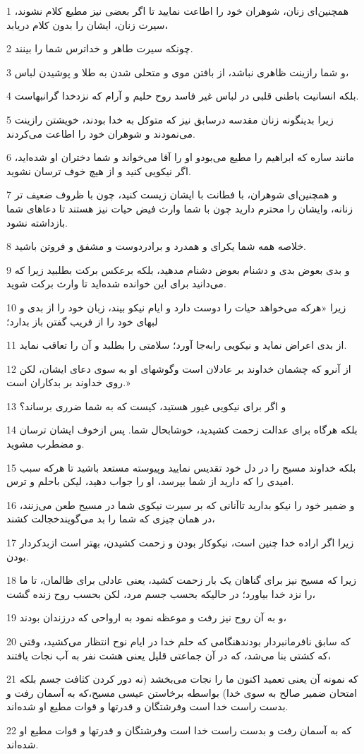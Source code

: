 \par 1 همچنین‌ای زنان، شوهران خود را اطاعت نمایید تا اگر بعضی نیز مطیع کلام نشوند، سیرت زنان، ایشان را بدون کلام دریابد،
\par 2 چونکه سیرت طاهر و خداترس شما را بینند.
\par 3 و شما رازینت ظاهری نباشد، از بافتن موی و متحلی شدن به طلا و پوشیدن لباس،
\par 4 بلکه انسانیت باطنی قلبی در لباس غیر فاسد روح حلیم و آرام که نزدخدا گرانبهاست.
\par 5 زیرا بدینگونه زنان مقدسه درسابق نیز که متوکل به خدا بودند، خویشتن رازینت می‌نمودند و شوهران خود را اطاعت می‌کردند.
\par 6 مانند ساره که ابراهیم را مطیع می‌بودو او را آقا می‌خواند و شما دختران او شده‌اید، اگر نیکویی کنید و از هیچ خوف ترسان نشوید.
\par 7 و همچنین‌ای شوهران، با فطانت با ایشان زیست کنید، چون با ظروف ضعیف تر زنانه، وایشان را محترم دارید چون با شما وارث فیض حیات نیز هستند تا دعاهای شما بازداشته نشود.
\par 8 خلاصه همه شما یکرای و همدرد و برادردوست و مشفق و فروتن باشید.
\par 9 و بدی بعوض بدی و دشنام بعوض دشنام مدهید، بلکه برعکس برکت بطلبید زیرا که می‌دانید برای این خوانده شده‌اید تا وارث برکت شوید.
\par 10 زیرا «هرکه می‌خواهد حیات را دوست دارد و ایام نیکو بیند، زبان خود را از بدی و لبهای خود را از فریب گفتن باز بدارد؛
\par 11 از بدی اعراض نماید و نیکویی رابه‌جا آورد؛ سلامتی را بطلبد و آن را تعاقب نماید.
\par 12 از آنرو که چشمان خداوند بر عادلان است وگوشهای او به سوی دعای ایشان، لکن روی خداوند بر بدکاران است.»
\par 13 و اگر برای نیکویی غیور هستید، کیست که به شما ضرری برساند؟
\par 14 بلکه هرگاه برای عدالت زحمت کشیدید، خوشابحال شما. پس ازخوف ایشان ترسان و مضطرب مشوید.
\par 15 بلکه خداوند مسیح را در دل خود تقدیس نمایید وپیوسته مستعد باشید تا هرکه سبب امیدی را که دارید از شما بپرسد، او را جواب دهید، لیکن باحلم و ترس.
\par 16 و ضمیر خود را نیکو بدارید تاآنانی که بر سیرت نیکوی شما در مسیح طعن می‌زنند، در همان چیزی که شما را بد می‌گویندخجالت کشند،
\par 17 زیرا اگر اراده خدا چنین است، نیکوکار بودن و زحمت کشیدن، بهتر است ازبدکردار بودن.
\par 18 زیرا که مسیح نیز برای گناهان یک بار زحمت کشید، یعنی عادلی برای ظالمان، تا ما را نزد خدا بیاورد؛ در حالیکه بحسب جسم مرد، لکن بحسب روح زنده گشت،
\par 19 و به آن روح نیز رفت و موعظه نمود به ارواحی که درزندان بودند،
\par 20 که سابق نافرمانبردار بودندهنگامی که حلم خدا در ایام نوح انتظار می‌کشید، وقتی که کشتی بنا می‌شد، که در آن جماعتی قلیل یعنی هشت نفر به آب نجات یافتند،
\par 21 که نمونه آن یعنی تعمید اکنون ما را نجات می‌بخشد (نه دور کردن کثافت جسم بلکه امتحان ضمیر صالح به سوی خدا) بواسطه برخاستن عیسی مسیح،که به آسمان رفت و بدست راست خدا است وفرشتگان و قدرتها و قوات مطیع او شده‌اند.
\par 22 که به آسمان رفت و بدست راست خدا است وفرشتگان و قدرتها و قوات مطیع او شده‌اند.

